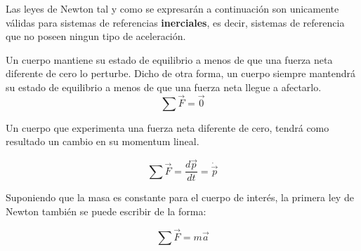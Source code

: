 \documentclass[/home/hernan/Documentos/Apuntes_mecanica_teorica/main.tex]{subfiles}
\begin{document}
	Las leyes de Newton tal y como se expresarán a continuación son unicamente válidas para sistemas de referencias \textbf{inerciales}, es decir, sistemas de referencia que no poseen ningun tipo de aceleración.


	\begin{definition}
		Un cuerpo mantiene su estado de equilibrio a menos de que una fuerza neta diferente de cero lo perturbe. Dicho de otra forma, un cuerpo siempre mantendrá su estado de equilibrio a menos de que una fuerza neta llegue a afectarlo.
		\begin{equation}
			\sum \vec{F} = \vec{0}
			\label{eq: Nfirstlaw}
		\end{equation}
		
	\end{definition}

	
	\begin{definition}
		Un cuerpo que experimenta una fuerza neta diferente de cero, tendrá como resultado un cambio en su momentum lineal.
		
		\begin{equation}
			\sum \vec{F} = \frac{d \vec{p}}{dt} = \dot{\vec{p}}
			\label{eq: NSecondlaw}
		\end{equation}

		Suponiendo que la masa es constante para el cuerpo de interés, la primera ley de Newton también se puede escribir de la forma:

		\begin{equation}
			\sum \vec{F} = m \vec{a}
		\end{equation}
	\end{definition}
\end{document}
